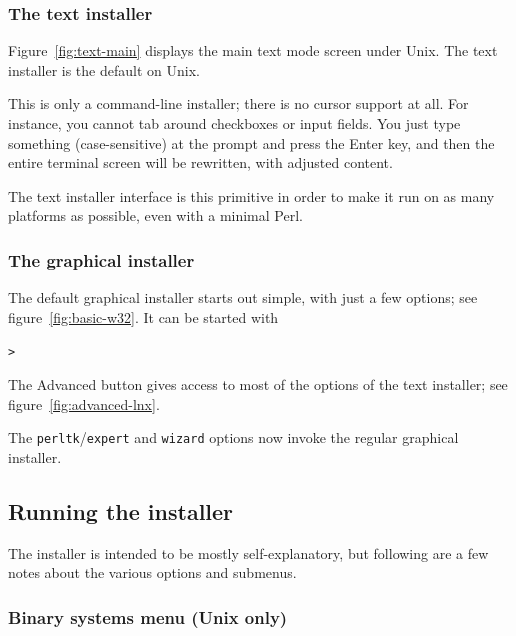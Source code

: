 \documentclass[12pt]{article}
\begin{document}
\subsubsection{The text installer}

Figure~\ref{fig:text-main} displays the main text mode screen under
Unix.  The text installer is the default on Unix.

This is only a command-line installer; there is no cursor support at
all.  For instance, you cannot tab around checkboxes or input fields.
You just type something (case-sensitive) at the prompt and press the
Enter key, and then the entire terminal screen will be rewritten, with
adjusted content.

The text installer interface is this primitive in order to make it run
on as many platforms as possible, even with a minimal Perl.

\subsubsection{The graphical installer}
\label{sec:graphical-inst}

The default graphical installer starts out simple, with just a
few options; see figure~\ref{fig:basic-w32}. It can be started with
\begin{alltt}
> 
\end{alltt}
The Advanced button gives access to most of the options of the text
installer; see figure~\ref{fig:advanced-lnx}.

The \texttt{perltk}/\texttt{expert} and \texttt{wizard} \GUI{}
options now invoke the regular graphical installer.

\subsection{Running the installer}
\label{sec:runinstall}

The installer is intended to be mostly self-explanatory, but following are a
few notes about the various options and submenus.

\subsubsection{Binary systems menu (Unix only)}
\label{sec:binary}
\end{document}
